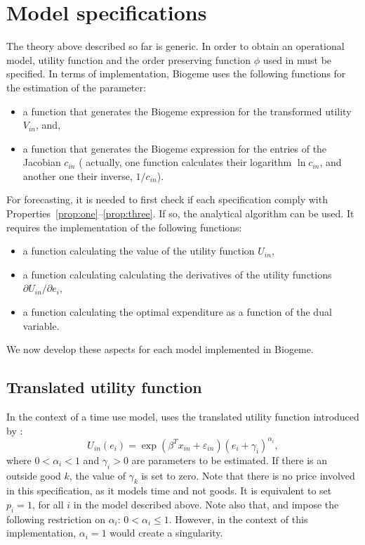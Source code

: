 \documentclass[12pt,a4paper]{article}
\begin{document}
\section{Model specifications}
\label{sec:models}
The theory above described so far is generic. In order to obtain an operational model, utility function and the
order preserving function $\phi$ used in  must be specified.
In terms of implementation, Biogeme uses the following functions for the estimation of the parameter:
\begin{itemize}
    \item a function that generates the Biogeme expression for the transformed utility $V_{in}$, and,
    \item a function that generates the Biogeme expression for the entries of the Jacobian $c_{in}$ (
     actually, one function calculates their logarithm $\ln c_{in}$, and another one their inverse, $1/c_{in}$).
\end{itemize}
For forecasting, it is needed to first check if each specification comply with  Properties~\ref{prop:one}--\ref{prop:three}.
If so, the analytical algorithm can be used. It requires the implementation of the following functions:
\begin{itemize}
    \item a function calculating the value of the utility function $U_{in}$,
    \item a function calculating calculating the derivatives of the utility functions $\partial U_{in}/\partial e_i$,
    \item a function calculating the optimal expenditure  as a function of the dual variable.
\end{itemize}


We now develop these aspects for each model implemented in Biogeme.


\subsection{Translated utility function}
In the context of a time use model,  uses the translated utility function introduced by
:
\begin{equation}
  \label{eq:orig_u}
U_{in}(e_i) = \exp(\beta^T x_{in} + \varepsilon_{in})(e_i + \gamma_i)^{\alpha_i},
\end{equation}
where $0 < \alpha_i < 1$ and $\gamma_i > 0$ are parameters to be
estimated. If there is an outside good $k$, the value of $\gamma_k$ is set to zero.
Note that there is no price involved in this specification,
as it models time and not goods. It is equivalent to set $p_i=1$, for all $i$ in the model
described above. Note also that,
 and  impose
the following restriction on $\alpha_i$: $0 < \alpha_i \leq
1$. However, in the context of this implementation, $\alpha_i=1$ would
create a singularity.
\end{document}
